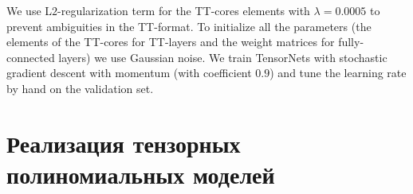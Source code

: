 
We use L$2$-regularization term for the TT-cores elements with $\lambda = 0.0005$ to prevent ambiguities in the TT-format. To initialize all the parameters (the elements of the TT-cores for TT-layers and the weight matrices for fully-connected layers) we use Gaussian noise. We train TensorNets with stochastic gradient descent with momentum (with coefficient $0.9$) and tune the learning rate by hand on the validation set.


\section{Реализация тензорных полиномиальных моделей} \label{sec:exm-experiments}




